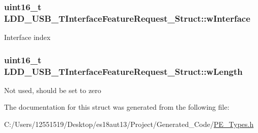 \subsubsection[{w\+Interface}]{\setlength{\rightskip}{0pt plus 5cm}uint16\+\_\+t L\+D\+D\+\_\+\+U\+S\+B\+\_\+\+T\+Interface\+Feature\+Request\+\_\+\+Struct\+::w\+Interface}\label{struct_l_d_d___u_s_b___t_interface_feature_request___struct_afc1da433b4a02f8c6a6ed6ce8b3065da}
Interface index \hypertarget{struct_l_d_d___u_s_b___t_interface_feature_request___struct_a5f54f1e83024342d9d63aad374a117ba}{}
\subsubsection[{w\+Length}]{\setlength{\rightskip}{0pt plus 5cm}uint16\+\_\+t L\+D\+D\+\_\+\+U\+S\+B\+\_\+\+T\+Interface\+Feature\+Request\+\_\+\+Struct\+::w\+Length}\label{struct_l_d_d___u_s_b___t_interface_feature_request___struct_a5f54f1e83024342d9d63aad374a117ba}
Not used, should be set to zero 

The documentation for this struct was generated from the following file\+:\begin{DoxyCompactItemize}
\item 
C\+:/\+Users/12551519/\+Desktop/es18aut13/\+Project/\+Generated\+\_\+\+Code/\hyperlink{_p_e___types_8h}{P\+E\+\_\+\+Types.\+h}\end{DoxyCompactItemize}
